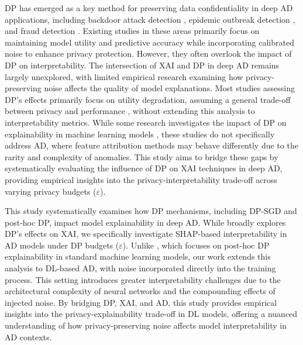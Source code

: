 DP has emerged as a key method for preserving data confidentiality in deep AD applications, including backdoor attack detection \citep{du2019robust}, epidemic outbreak detection \citep{fan2013differentially}, and fraud detection \citep{wang2018privacy}. Existing studies in these areas primarily focus on maintaining model utility and predictive accuracy while incorporating calibrated noise to enhance privacy protection. However, they often overlook the impact of DP on interpretability. The intersection of XAI and DP in deep AD remains largely unexplored, with limited empirical research examining how privacy-preserving noise affects the quality of model explanations. Most studies assessing DP’s effects primarily focus on utility degradation, assuming a general trade-off between privacy and performance \citep{wu2020value, arous2023exploring}, without extending this analysis to interpretability metrics. While some research investigates the impact of DP on explainability in machine learning models \citep{naidu2021differential, bozorgpanah2022privacy}, these studies do not specifically address AD, where feature attribution methods may behave differently due to the rarity and complexity of anomalies. This study aims to bridge these gaps by systematically evaluating the influence of DP on XAI techniques in deep AD, providing empirical insights into the privacy-interpretability trade-off across varying privacy budgets ($\varepsilon$).

This study systematically examines how DP mechanisms, including DP-SGD and post-hoc DP, impact model explainability in deep AD. While \cite{saifullah2022privacy} broadly explores DP’s effects on XAI, we specifically investigate SHAP-based interpretability in AD models under DP budgets ($\varepsilon$). Unlike \cite{ezzeddine2024differential}, which focuses on post-hoc DP explainability in standard machine learning models, our work extends this analysis to DL-based AD, with noise incorporated directly into the training process. This setting introduces greater interpretability challenges due to the architectural complexity of neural networks and the compounding effects of injected noise. By bridging DP, XAI, and AD, this study provides empirical insights into the privacy-explainability trade-off in DL models, offering a nuanced understanding of how privacy-preserving noise affects model interpretability in AD contexts.

